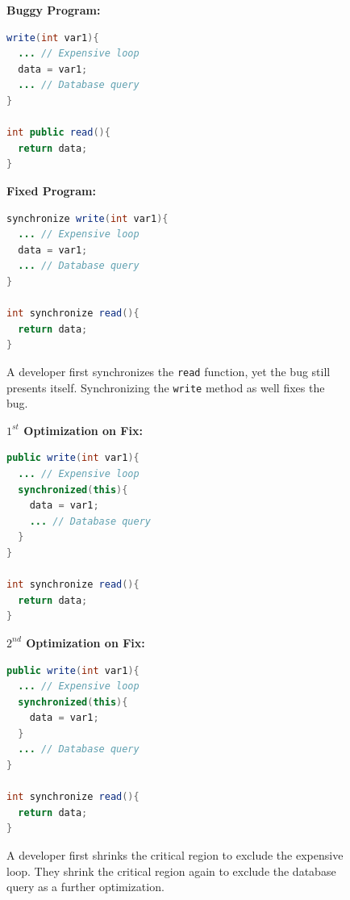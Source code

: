 \documentclass[10pt, conference, compsocconf]{IEEEtran}
\begin{document}
\begin{figure}[!h]
\vspace{2mm}
\begin{minipage}{3.70cm}
\footnotesize{\textbf{Buggy Program:}}
\begin{lstlisting}[language=Java]
write(int var1){
  ... // Expensive loop
  data = var1;
  ... // Database query
}

int public read(){
  return data;
}
\end{lstlisting}
\end{minipage}\hfill
\begin{minipage}{3.70cm}
\footnotesize{\textbf{Fixed Program:}}
\begin{lstlisting}[language=Java]
synchronize write(int var1){
  ... // Expensive loop
  data = var1;
  ... // Database query
}

int synchronize read(){
  return data;
}
\end{lstlisting}
\end{minipage}
\caption{A developer first synchronizes the \texttt{read} function, yet the bug
still presents itself. Synchronizing the \texttt{write} method as well fixes
the bug.}
\label{fig:fixed_sample_datarace}
\end{figure}

\begin{figure}[!h]
\vspace{2mm}
\begin{minipage}{3.70cm}
\footnotesize{\textbf{$1^{st}$ Optimization on Fix:}}
\begin{lstlisting}[language=Java]
public write(int var1){
  ... // Expensive loop
  synchronized(this){
    data = var1;
    ... // Database query
  }
}

int synchronize read(){
  return data;
}
\end{lstlisting}
\end{minipage}\hfill
\begin{minipage}{3.70cm}
\footnotesize{\textbf{$2^{nd}$ Optimization on Fix:}}
\begin{lstlisting}[language=Java]
public write(int var1){
  ... // Expensive loop
  synchronized(this){
    data = var1;
  }
  ... // Database query
}

int synchronize read(){
  return data;
}
\end{lstlisting}
\end{minipage}
\caption{A developer first shrinks the critical region to exclude the expensive
loop. They shrink the critical region again to exclude the database query as a
further optimization.}
\label{fig:optimized_sample_datarace}
\end{figure}
\end{document}
